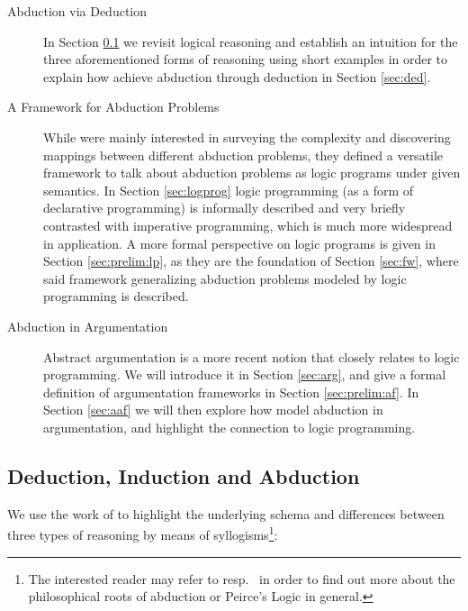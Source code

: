\documentclass[a4paper]{article}
\begin{document}
\begin{description}
	\item[Abduction via Deduction] In Section \ref{sec:ction} we revisit logical reasoning and establish an intuition for the three aforementioned forms of reasoning using short examples in order to explain how \citet{DBLP:journals/logcom/ConsoleDT91} achieve abduction through deduction in Section \ref{sec:ded}.
	\item[A Framework for Abduction Problems] While \citet{DBLP:journals/tcs/EiterGL97} were mainly interested in surveying the complexity and discovering mappings between different abduction problems, they defined a versatile framework to talk about abduction problems as logic programs under given semantics. In Section \ref{sec:logprog} logic programming (as a form of declarative programming) is informally described and very briefly contrasted with imperative programming, which is much more widespread in application. A more formal perspective on logic programs is given in Section \ref{sec:prelim:lp}, as they are the foundation of Section \ref{sec:fw}, where said framework generalizing abduction problems modeled by logic programming is described.
	\item[Abduction in Argumentation] Abstract argumentation is a more recent notion that closely relates to logic programming. We will introduce it in Section \ref{sec:arg}, and give a formal definition of argumentation frameworks in Section \ref{sec:prelim:af}. In Section \ref{sec:aaf} we will then explore how \citet{DBLP:conf/ecai/BoothGKRT14} model abduction in argumentation, and highlight the connection to logic programming.
\end{description}

\subsection{Deduction, Induction and Abduction}
\label{sec:ction}

We use the work of \citet{dih} to highlight the underlying schema and differences between three types of reasoning by means of syllogisms\footnote{The interested reader may refer to \cite{sep-abduction} resp.~\cite{peirce1940philosophical} in order to find out more about the philosophical roots of abduction or Peirce's Logic in general.}:

\newpage
\end{document}
